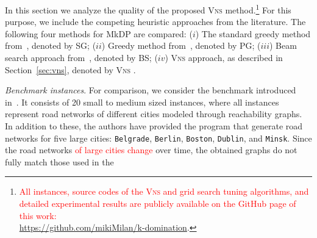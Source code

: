 \documentclass[dvipsnames,format=sigconf]{acmart} %
\begin{document}
In this section we analyze the quality of the proposed \textsc{Vns} method.\footnote{\textcolor{red}{All instances, source codes of the \textsc{Vns} and grid search tuning algorithms, and detailed experimental results are publicly available on the GitHub page of this work: \\\url{https://github.com/mikiMilan/k-domination}}.} For this purpose, we include the competing heuristic approaches from the literature. The following four methods for MkDP are compared:  
 ($i$) The standard greedy method from~\cite{parekh1991analysis,gagarin2013randomized}, denoted by SG; ($ii$) Greedy method from~\cite{gagarin2018multiple}, denoted by PG; ($iii$) Beam search approach from~\cite{corcoran2021heuristics}, denoted by BS; ($iv$) \textsc{Vns} approach, as described in Section~\ref{sec:vns}, denoted by \textsc{Vns} .  
 


\emph{Benchmark instances}. For comparison, we consider the benchmark introduced in~\cite{corcoran2021heuristics}. It consists of 20 small to medium sized instances, where all instances represent road networks of different cities modeled through reachability graphs. In addition to these, the authors have provided the program that generate road networks for five large cities: \texttt{Belgrade}, \texttt{Berlin}, \texttt{Boston}, \texttt{Dublin}, and \texttt{Minsk}. Since the road networks \textcolor{red}{of large cities change} over time, the obtained graphs do not fully match those used in the \cite{corcoran2021heuristics}

\end{document}

